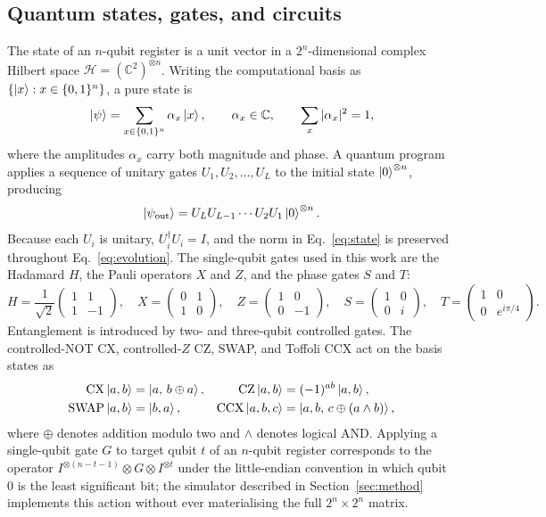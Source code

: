 \documentclass[11pt,a4paper]{article}
\begin{document}
\subsection{Quantum states, gates, and circuits}
The state of an $n$-qubit register is a unit vector in a $2^{n}$-dimensional complex Hilbert space $\mathcal{H}=(\mathbb{C}^{2})^{\otimes n}$. Writing the computational basis as $\{\ket{x}: x\in\{0,1\}^{n}\}$, a pure state is
\begin{equation}
\ket{\psi}=\sum_{x\in\{0,1\}^{n}}\alpha_{x}\ket{x},\qquad \alpha_x\in\mathbb{C},\qquad \sum_{x}|\alpha_{x}|^{2}=1,
\label{eq:state}
\end{equation}
where the amplitudes $\alpha_x$ carry both magnitude and phase. A quantum program applies a sequence of unitary gates $U_1,U_2,\dots,U_L$ to the initial state $\ket{0}^{\otimes n}$, producing
\begin{equation}
\ket{\psi_{\mathrm{out}}}=U_{L}U_{L-1}\cdots U_{2}U_{1}\ket{0}^{\otimes n}.
\label{eq:evolution}
\end{equation}
Because each $U_i$ is unitary, $U_i^{\dagger}U_i=I$, and the norm in Eq.~\eqref{eq:state} is preserved throughout Eq.~\eqref{eq:evolution}. The single-qubit gates used in this work are the Hadamard $H$, the Pauli operators $X$ and $Z$, and the phase gates $S$ and $T$:
\begin{equation}
H=\frac{1}{\sqrt{2}}\begin{pmatrix}1&1\\1&-1\end{pmatrix},\quad
X=\begin{pmatrix}0&1\\1&0\end{pmatrix},\quad
Z=\begin{pmatrix}1&0\\0&-1\end{pmatrix},\quad
S=\begin{pmatrix}1&0\\0&i\end{pmatrix},\quad
T=\begin{pmatrix}1&0\\0&e^{i\pi/4}\end{pmatrix}.
\label{eq:singlegates}
\end{equation}
Entanglement is introduced by two- and three-qubit controlled gates. The controlled-NOT $\mathrm{CX}$, controlled-$Z$ $\mathrm{CZ}$, SWAP, and Toffoli $\mathrm{CCX}$ act on the basis states as
\begin{align}
\mathrm{CX}\ket{a,b}&=\ket{a,\,b\oplus a}, &
\mathrm{CZ}\ket{a,b}&=(-1)^{ab}\ket{a,b}, \label{eq:cxcz}\\
\mathrm{SWAP}\ket{a,b}&=\ket{b,a}, &
\mathrm{CCX}\ket{a,b,c}&=\ket{a,b,\,c\oplus(a\wedge b)}, \label{eq:swapccx}
\end{align}
where $\oplus$ denotes addition modulo two and $\wedge$ denotes logical AND. Applying a single-qubit gate $G$ to target qubit $t$ of an $n$-qubit register corresponds to the operator $I^{\otimes(n-t-1)}\otimes G\otimes I^{\otimes t}$ under the little-endian convention in which qubit $0$ is the least significant bit; the simulator described in Section~\ref{sec:method} implements this action without ever materialising the full $2^n\times 2^n$ matrix.
\end{document}
